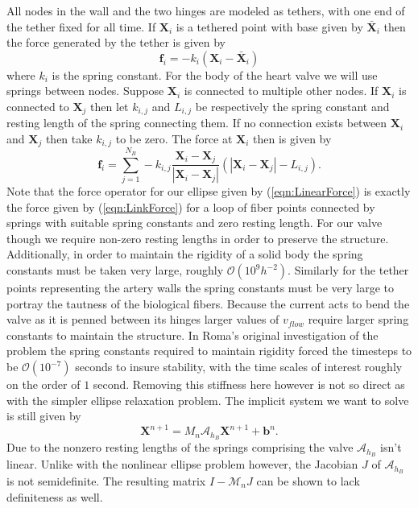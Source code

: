 \documentclass[preprint,12pt]{elsarticle}
\begin{document}
All nodes in the wall and the two hinges are modeled as tethers, with one end of the tether fixed for all time. If $\mathbf{X}_i$ is a tethered point with base given by $\bar{\mathbf{X}}_i$ then the force generated by the tether is given by 
\begin{equation}
\mathbf{f}_i = -k_i (\mathbf{X}_i-\bar{\mathbf{X}}_i)
\label{eqn:TetherForce}
\end{equation}
where $k_i$ is the spring constant. For the body of the heart valve we will use springs between nodes. Suppose $\mathbf{X}_i$ is connected to multiple other nodes. If $\mathbf{X}_i$ is connected to $\mathbf{X}_j$ then let $k_{i,j}$ and $L_{i,j}$ be respectively the spring constant and resting length of the spring connecting them. If no connection exists between $\mathbf{X}_i$ and $\mathbf{X}_j$ then take $k_{i,j}$ to be zero. The force at $\mathbf{X}_i$ then is given by
\begin{equation}
\mathbf{f}_i = \sum_{j=1}^{N_B} -k_{i,j} \frac{\mathbf{X}_i-\mathbf{X}_j}{|\mathbf{X}_i-\mathbf{X}_j|}
(|\mathbf{X}_i-\mathbf{X}_j| - L_{i,j}).
\label{eqn:LinkForce}
\end{equation}
Note that the force operator for our ellipse given by (\ref{eqn:LinearForce}) is exactly the force given by (\ref{eqn:LinkForce}) for a loop of fiber points connected by springs with suitable spring constants and zero resting length.
For our valve though we require non-zero resting lengths in order to preserve the structure. Additionally, in order to maintain the rigidity of a solid body the spring constants must be taken very large, roughly $\mathcal{O}(10^9h^{-2})$. Similarly for the tether points representing the artery walls the spring constants must be very large to portray the tautness of the biological fibers. Because the current acts to bend the valve as it is penned between its hinges larger values of $v_{flow}$ require larger spring constants to maintain the structure. In Roma's original investigation of the problem the spring constants required to maintain rigidity forced the timesteps to be $\mathcal{O(10^{-7})}$ seconds to insure stability, with the time scales of interest roughly on the order of $1$ second. Removing this stiffness here however is not so direct as with the simpler ellipse relaxation problem. The implicit system we want to solve is still given by
\begin{equation}
\mathbf{X}^{n+1} = \mathit{M}_n\mathcal{A}_{h_B} \mathbf{X}^{n+1} + \mathbf{b}^n.
\label{eqn:Sys2again}
\end{equation}
Due to the nonzero resting lengths of the springs comprising the valve 
$\mathcal{A}_{h_B}$ isn't linear.
Unlike with the nonlinear ellipse problem however, the Jacobian $J$ of $\mathcal{A}_{h_B}$ is not semidefinite. The resulting matrix $I - \mathcal{M}_nJ$ can be shown to lack definiteness as well.
\end{document}
